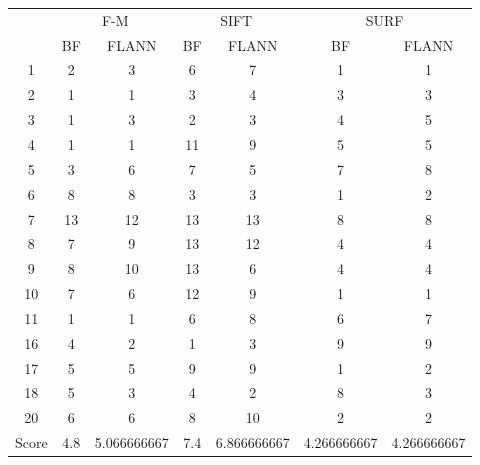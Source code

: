 \documentclass[draft,final]{vutinfth} %
\begin{document}
\begin{minipage}{\linewidth}
\centering
\begin{tabular}{ccccccc}
\multirow{2}{*}{ } & \multicolumn{2}{c}{ F-M } & \multicolumn{2}{c}{ SIFT } & \multicolumn{2}{c}{ SURF } \\
& BF & FLANN & BF & FLANN & BF & FLANN \\
1 & 2 & 3 & 6 & 7 & 1 & 1 \\
2 & 1 & 1 & 3 & 4 & 3 & 3 \\
3 & 1 & 3 & 2 & 3 & 4 & 5 \\
4 & 1 & 1 & 11 & 9 & 5 & 5 \\
5 & 3 & 6 & 7 & 5 & 7 & 8 \\
6 & 8 & 8 & 3 & 3 & 1 & 2 \\
7 & 13 & 12 & 13 & 13 & 8 & 8 \\
8 & 7 & 9 & 13 & 12 & 4 & 4 \\
9 & 8 & 10 & 13 & 6 & 4 & 4 \\
10 & 7 & 6 & 12 & 9 & 1 & 1 \\
11 & 1 & 1 & 6 & 8 & 6 & 7 \\
16 & 4 & 2 & 1 & 3 & 9 & 9 \\
17 & 5 & 5 & 9 & 9 & 1 & 2 \\
18 & 5 & 3 & 4 & 2 & 8 & 3 \\
20 & 6 & 6 & 8 & 10 & 2 & 2 \\
Score & 4.8 & 5.066666667 & 7.4 & 6.866666667 & 4.266666667 & 4.266666667 \\
\end{tabular}
 \label{tab:20Cent} 
\end{minipage}
\end{document}
